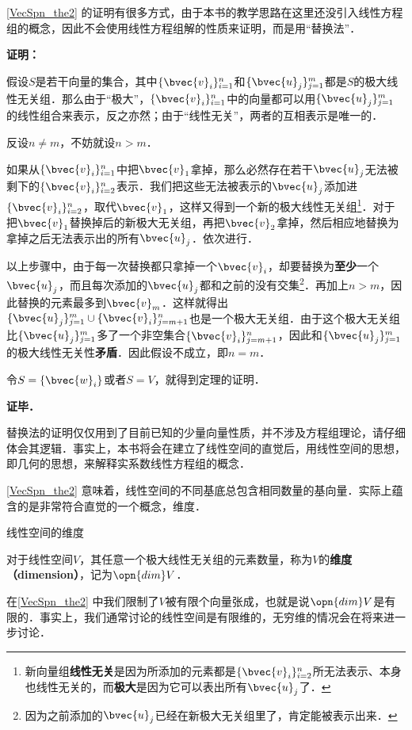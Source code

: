\autoref{VecSpn_the2} 的证明有很多方式，由于本书的教学思路在这里还没引入线性方程组的概念，因此不会使用线性方程组解的性质来证明，而是用“替换法”．

\textbf{证明：}

假设$S$是若干向量的集合，其中$\{\bvec{v}_i\}_{i=1}^n$和$\{\bvec{u}_j\}^m_{j=1}$都是$S$的极大线性无关组．那么由于“极大”，$\{\bvec{v}_i\}_{i=1}^n$中的向量都可以用$\{\bvec{u}_j\}^m_{j=1}$的线性组合来表示，反之亦然；由于“线性无关”，两者的互相表示是唯一的．

反设$n\not=m$，不妨就设$n>m$．

如果从$\{\bvec{v}_i\}_{i=1}^n$中把$\bvec{v}_1$拿掉，那么必然存在若干$\bvec{u}_j$无法被剩下的$\{\bvec{v}_i\}_{i=2}^n$表示．我们把这些无法被表示的$\bvec{u}_j$添加进$\{\bvec{v}_i\}_{i=2}^n$，取代$\bvec{v}_1$，这样又得到一个新的极大线性无关组\footnote{新向量组\textbf{线性无关}是因为所添加的元素都是$\{\bvec{v}_i\}_{i=2}^n$所无法表示、本身也线性无关的，而\textbf{极大}是因为它可以表出所有$\bvec{u}_j$了．}．对于把$\bvec{v}_1$替换掉后的新极大无关组，再把$\bvec{v}_2$拿掉，然后相应地替换为拿掉之后无法表示出的所有$\bvec{u}_j$．依次进行．

以上步骤中，由于每一次替换都只拿掉一个$\bvec{v}_i$，却要替换为\textbf{至少}一个$\bvec{u}_j$，而且每次添加的$\bvec{u}_j$都和之前的没有交集\footnote{因为之前添加的$\bvec{u}_j$已经在新极大无关组里了，肯定能被表示出来．}．再加上$n>m$，因此替换的元素最多到$\bvec{v}_m$．这样就得出$\{\bvec{u}_j\}^m_{j=1}\cup\{\bvec{v}_i\}^n_{j=m+1}$也是一个极大无关组．由于这个极大无关组比$\{\bvec{u}_j\}^m_{j=1}$多了一个非空集合$\{\bvec{v}_i\}^n_{j=m+1}$，因此和$\{\bvec{u}_j\}^m_{j=1}$的极大线性无关性\textbf{矛盾}．因此假设不成立，即$n=m$．

令$S=\{\bvec{w}_i\}$或者$S=V$，就得到定理的证明．

\textbf{证毕．}

替换法的证明仅仅用到了目前已知的少量向量性质，并不涉及方程组理论，请仔细体会其逻辑．事实上，本书将会在建立了线性空间的直觉后，用线性空间的思想，即几何的思想，来解释实系数线性方程组的概念．

\autoref{VecSpn_the2} 意味着，线性空间的不同基底总包含相同数量的基向量．实际上蕴含的是非常符合直觉的一个概念，维度．

\begin{definition}{线性空间的维度}

对于线性空间$V$，其任意一个极大线性无关组的元素数量，称为$V$的\textbf{维度（dimension）}，记为$\opn{dim}V$．

\end{definition}

在\autoref{VecSpn_the2} 中我们限制了$V$被有限个向量张成，也就是说$\opn{dim}V$是有限的．事实上，我们通常讨论的线性空间是有限维的，无穷维的情况会在将来进一步讨论．



